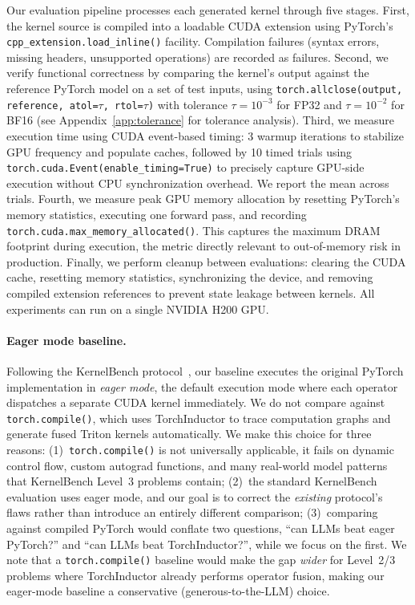 \documentclass[]{fairmeta}
\begin{document}
Our evaluation pipeline processes each generated kernel through five stages. First, the kernel source is compiled into a loadable CUDA extension using PyTorch's \texttt{cpp\_extension.load\_inline()} facility. Compilation failures (syntax errors, missing headers, unsupported operations) are recorded as failures. Second, we verify functional correctness by comparing the kernel's output against the reference PyTorch model on a set of test inputs, using \texttt{torch.allclose(output, reference, atol=$\tau$, rtol=$\tau$)} with tolerance $\tau = 10^{-3}$ for FP32 and $\tau = 10^{-2}$ for BF16 (see Appendix~\ref{app:tolerance} for tolerance analysis). Third, we measure execution time using CUDA event-based timing: 3 warmup iterations to stabilize GPU frequency and populate caches, followed by 10 timed trials using \texttt{torch.cuda.Event(enable\_timing=True)} to precisely capture GPU-side execution without CPU synchronization overhead. We report the mean across trials. Fourth, we measure peak GPU memory allocation by resetting PyTorch's memory statistics, executing one forward pass, and recording \texttt{torch.cuda.max\_memory\_allocated()}. This captures the maximum DRAM footprint during execution, the metric directly relevant to out-of-memory risk in production. Finally, we perform cleanup between evaluations: clearing the CUDA cache, resetting memory statistics, synchronizing the device, and removing compiled extension references to prevent state leakage between kernels.
All experiments can run on a single NVIDIA H200 GPU.

\paragraph{Eager mode baseline.} Following the KernelBench protocol~\citep{kernelbench}, our baseline executes the original PyTorch implementation in \emph{eager mode}, the default execution mode where each operator dispatches a separate CUDA kernel immediately. We do not compare against \texttt{torch.compile()}, which uses TorchInductor to trace computation graphs and generate fused Triton kernels automatically. We make this choice for three reasons: (1)~\texttt{torch.compile()} is not universally applicable, it fails on dynamic control flow, custom autograd functions, and many real-world model patterns that KernelBench Level~3 problems contain; (2)~the standard KernelBench evaluation uses eager mode, and our goal is to correct the \emph{existing} protocol's flaws rather than introduce an entirely different comparison; (3)~comparing against compiled PyTorch would conflate two questions, ``can LLMs beat eager PyTorch?'' and ``can LLMs beat TorchInductor?'', while we focus on the first. We note that a \texttt{torch.compile()} baseline would make the gap \emph{wider} for Level~2/3 problems where TorchInductor already performs operator fusion, making our eager-mode baseline a conservative (generous-to-the-LLM) choice.
\end{document}
